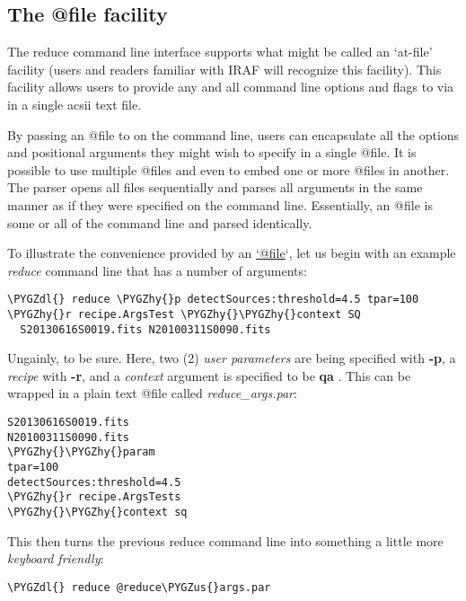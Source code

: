 \documentclass[letterpaper,10pt,english]{sphinxmanual}
\def\PYGZus{\char`\_}
\def\PYGZdl{\char`\$}
\def\PYGZhy{\char`\-}
\begin{document}
\subsection{The @file facility}
\label{interfaces:the-file-facility}\label{interfaces:atfile}
The reduce command line interface supports what might be called an `at-file'
facility (users and readers familiar with IRAF will recognize this facility).
This facility allows users to provide any and all command line options and flags
to  via in a single acsii text file.

By passing an @file to  on the command line, users can encapsulate all
the options and positional arguments they might wish to specify in a single
@file. It is possible to use multiple @files and even to embed one or more
@files in another. The parser opens all files sequentially and parses
all arguments in the same manner as if they were specified on the command line.
Essentially, an @file is some or all of the command line and parsed identically.

To illustrate the convenience provided by an \href{mailto:'@file}{`@file}`, let us begin with an
example \emph{reduce} command line that has a number of arguments:

\begin{Verbatim}[commandchars=\\\{\}]
\PYGZdl{} reduce \PYGZhy{}p detectSources:threshold=4.5 tpar=100 \PYGZhy{}r recipe.ArgsTest \PYGZhy{}\PYGZhy{}context SQ
  S20130616S0019.fits N20100311S0090.fits
\end{Verbatim}

Ungainly, to be sure. Here, two (2) \emph{user parameters} are being specified
with \textbf{-p}, a \emph{recipe} with \textbf{-r}, and a \emph{context} argument is specified
to be \textbf{qa} . This can be wrapped in a plain text @file called
\emph{reduce\_args.par}:

\begin{Verbatim}[commandchars=\\\{\}]
S20130616S0019.fits
N20100311S0090.fits
\PYGZhy{}\PYGZhy{}param
tpar=100
detectSources:threshold=4.5
\PYGZhy{}r recipe.ArgsTests
\PYGZhy{}\PYGZhy{}context sq
\end{Verbatim}

This then turns the previous reduce command line into something a little more
\emph{keyboard friendly}:

\begin{Verbatim}[commandchars=\\\{\}]
\PYGZdl{} reduce @reduce\PYGZus{}args.par
\end{Verbatim}
\end{document}
